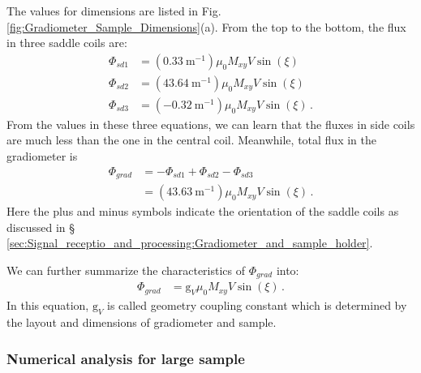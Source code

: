 The values for dimensions are listed in Fig.\,\ref{fig:Gradiometer_Sample_Dimensions}(a). 
From the top to the bottom, the flux in three saddle coils are:
\begin{align}
    \Phi_{sd1} &= (\SI{0.33}{\meter^{-1}}) \mu_0 M_{xy} V \sin (\xi) \\
    \Phi_{sd2} &=(\SI{43.64}{\meter^{-1}}) \mu_0 M_{xy} V \sin (\xi) \\
    \Phi_{sd3} &=(\SI{-0.32}{\meter^{-1}}) \mu_0 M_{xy} V \sin (\xi)\,. 
\end{align}
From the values in these three equations, we can learn that the fluxes in side coils are much less than the one in the central coil. Meanwhile, total flux in the gradiometer is 
\begin{align}
    \Phi_{grad}&=-\Phi_{sd1}+\Phi_{sd2}-\Phi_{sd3} \nonumber \\
                &=(\SI{43.63}{\meter^{-1}}) \mu_0 M_{xy} V\sin (\xi)\,. \label{eq:Phigrad_smallsample}
\end{align}
Here the plus and minus symbols indicate the orientation of the saddle coils as discussed in \S\,\ref{sec:Signal_receptio_and_processing:Gradiometer_and_sample_holder}. 

We can further summarize the characteristics of $\Phi_{grad}$ into:
\begin{align}
    \Phi_{grad}&=\mathrm{g}_V \mu_0 M_{xy} V \sin (\xi)\,. \label{eq:Phigrad_gV}
\end{align}
In this equation, $\mathrm{g}_V$ is called geometry coupling constant which is determined by the layout and dimensions of gradiometer and sample. 

\subsubsection{Numerical analysis for large sample}

